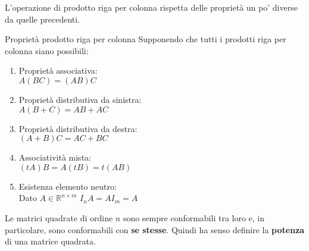 L'operazione di prodotto riga per colonna rispetta delle proprietà un po' diverse da quelle precedenti.
\begin{teo}{Proprietà prodotto riga per colonna}
    Supponendo che tutti i prodotti riga per colonna siano possibili:
    \begin{enumerate}
        \item Proprietà associativa: \\
              $A(BC) = (AB)C$

        \item Proprietà distributiva da sinistra: \\
              $A(B + C) = AB + AC$

        \item Proprietà distributiva da destra: \\
              $(A + B)C = AC + BC$

        \item Associatività mista: \\
              $(tA)B = A(tB) = t(AB)$

        \item Esistenza elemento neutro: \\
              Dato $A \in \mathbb{R}^{n\times m}$ $I_nA = AI_m = A$
    \end{enumerate}
\end{teo}

Le matrici quadrate di ordine $n$ sono sempre conformabili tra loro e, in particolare, sono conformabili con \textbf{se stesse}. Quindi ha senso definire la \textbf{potenza} di una matrice quadrata.

